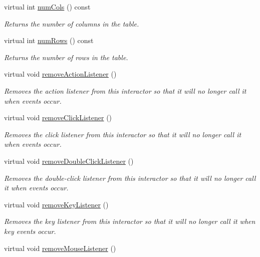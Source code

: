 \begin{DoxyCompactItemize}
virtual int \mbox{\hyperlink{classGTable_a5997e103e56aae1db12e1f7f02e136c5}{num\+Cols}} () const
\begin{DoxyCompactList}\small\item\em Returns the number of columns in the table. \end{DoxyCompactList}\item 
virtual int \mbox{\hyperlink{classGTable_a00b7e69dd5c43e42cc91db26c459ad8b}{num\+Rows}} () const
\begin{DoxyCompactList}\small\item\em Returns the number of rows in the table. \end{DoxyCompactList}\item 
virtual void \mbox{\hyperlink{classGInteractor_ab7fe7a876367b87cf7202f947f1d05e4}{remove\+Action\+Listener}} ()
\begin{DoxyCompactList}\small\item\em Removes the action listener from this interactor so that it will no longer call it when events occur. \end{DoxyCompactList}\item 
virtual void \mbox{\hyperlink{classGInteractor_ad39d0325cde6b97ebda4b9d7787c633b}{remove\+Click\+Listener}} ()
\begin{DoxyCompactList}\small\item\em Removes the click listener from this interactor so that it will no longer call it when events occur. \end{DoxyCompactList}\item 
virtual void \mbox{\hyperlink{classGInteractor_aa4250907e4cdd77349c04f0cf5cdd3d3}{remove\+Double\+Click\+Listener}} ()
\begin{DoxyCompactList}\small\item\em Removes the double-\/click listener from this interactor so that it will no longer call it when events occur. \end{DoxyCompactList}\item 
virtual void \mbox{\hyperlink{classGInteractor_a43095f41cab3be732b49f29970484b05}{remove\+Key\+Listener}} ()
\begin{DoxyCompactList}\small\item\em Removes the key listener from this interactor so that it will no longer call it when key events occur. \end{DoxyCompactList}\item 
virtual void \mbox{\hyperlink{classGInteractor_aff47f71ce47e688a07c9d38dc92fcc11}{remove\+Mouse\+Listener}} ()

\end{DoxyCompactItemize}

